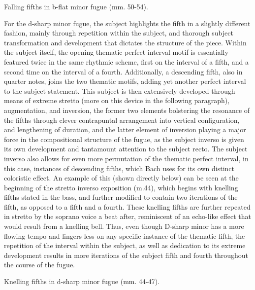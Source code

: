 \begin{Example}[H]
    \begin{center}
    \caption{ Falling fifths in b-flat minor fugue (mm. 50-54). }
    \end{center}
\end{Example}
    
    For the d-sharp minor fugue, the subject highlights the fifth in a
slightly different fashion, mainly through repetition within the
subject, and thorough subject transformation and development that
dictates the structure of the piece. Within the subject itself, the
opening thematic perfect interval motif is essentially featured twice in
the same rhythmic scheme, first on the interval of a fifth, and a second
time on the interval of a fourth. Additionally, a descending fifth, also
in quarter notes, joins the two thematic motifs, adding yet another
perfect interval to the subject statement. This subject is then
extensively developed through means of extreme stretto (more on this
device in the following paragraph), augmentation, and inversion, the
former two elements bolstering the resonance of the fifths through
clever contrapuntal arrangement into vertical configuration, and
lengthening of duration, and the latter element of inversion playing a
major force in the compositional structure of the fugue, as the subject
inverso is given its own development and tantamount attention to the
subject recto. The subject inverso also allows for even more permutation
of the thematic perfect interval, in this case, instances of descending
fifths, which Bach uses for its own distinct coloristic effect. An
example of this (shown directly below) can be seen at the beginning of
the stretto inverso exposition (m.44), which begins with knelling fifths
stated in the bass, and further modified to contain two iterations of
the fifth, as opposed to a fifth and a fourth. These knelling fifths are
further repeated in stretto by the soprano voice a beat after,
reminiscent of an echo-like effect that would result from a knelling
bell. Thus, even though D-sharp minor has a more flowing tempo and
lingers less on any specific instance of the thematic fifth, the
repetition of the interval within the subject, as well as dedication to
its extreme development results in more iterations of the subject fifth
and fourth throughout the course of the fugue.



\begin{Example}[H]
    \begin{center}
    \caption{ Knelling fifths in d-sharp minor fugue (mm. 44-47). }
    \end{center}
\end{Example}
    
